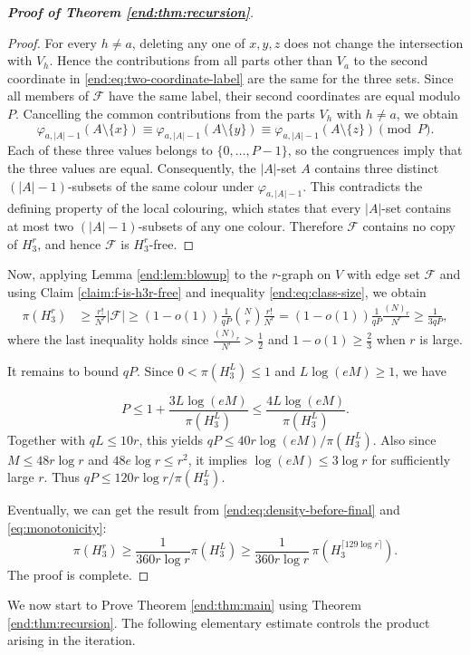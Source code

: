 \documentclass[12pt,a4paper]{article}
\numberwithin{equation}{section}
\theoremstyle{definition}
\theoremstyle{remark}
\begin{document}
\begin{proof}[\bfseries{Proof of Theorem \ref{end:thm:recursion}}]
\begin{proof}
For every $h\ne a$, deleting any one of $x,y,z$ does not change the intersection with $V_h$.  Hence the contributions from all parts other than $V_a$ to the second coordinate in \eqref{end:eq:two-coordinate-label} are the same for the three sets.  Since all members of $\mathcal F$ have the same label, their second coordinates are equal modulo $P$.  Cancelling the common contributions from the parts $V_h$ with $h\ne a$, we obtain
$$ \varphi_{a,|A|-1}(A\setminus\{x\})
 \equiv\varphi_{a,|A|-1}(A\setminus\{y\})
 \equiv\varphi_{a,|A|-1}(A\setminus\{z\})\pmod P.$$
Each of these three values belongs to $\{0,\ldots,P-1\}$, so the congruences imply that the three values are equal.  Consequently, the $|A|$-set $A$ contains three distinct $(|A|-1)$-subsets of the same colour under $\varphi_{a,|A|-1}$.  This contradicts the defining property of the local colouring, which states that every $|A|$-set contains at most two $(|A|-1)$-subsets of any one colour.  Therefore $\mathcal F$ contains no copy of $H_3^r$, and hence $\mathcal F$ is $H_3^r$-free.
\end{proof}

Now, applying Lemma \ref{end:lem:blowup} to the $r$-graph on $V$ with edge set $\mathcal F$ and using Claim \ref{claim:f-is-h3r-free} and inequality \eqref{end:eq:class-size}, we obtain
\begin{align}\label{end:eq:density-before-final}
  \pi(H_3^r)&\geq \frac{r!}{N^r}|\mathcal{F}|\ge (1-o(1))\frac{1}{qP}\binom{N}{r}\frac{r!}{N^r}=(1-o(1))\frac{1}{qP}\frac{(N)_r}{N^r}\ge \frac{1}{3qP}, 
\end{align}
where the last inequality holds since $\frac{(N)_r}{N^r}>\frac12$ and $1-o(1)\ge \frac{2}{3}$ when $r$ is large.

It remains to bound $qP$.  Since $0<\pi(H_3^L)\le1$ and $L\log(eM)\ge1$, we have

$$ P\le1+\frac{3L\log(eM)}{\pi(H_3^L)}
 \le\frac{4L\log(eM)}{\pi(H_3^L)}.$$
Together with $qL\le10r$, this yields
$qP\le40r\log(eM)/\pi(H_3^L)$. Also since $M\le48r\log r$ and $48e\log r\le r^2$, it implies $\log(eM)\le3\log r$ for sufficiently large $r$.  Thus
$qP\le120r\log r/\pi(H_3^L)$.
 
Eventually, we can get the result from  \eqref{end:eq:density-before-final} and \eqref{eq:monotonicity}:
$$ \pi(H_3^r)\ge\frac1{360r\log r}\pi(H_3^L)\ge\frac1{360r\log r}\,
 \pi(H_3^{\lceil129\log r\rceil}).$$
The proof is complete.  
\end{proof}

We now start to Prove Theorem \ref{end:thm:main} using Theorem \ref{end:thm:recursion}.  The following elementary estimate controls the product arising in the iteration.
\end{document}

